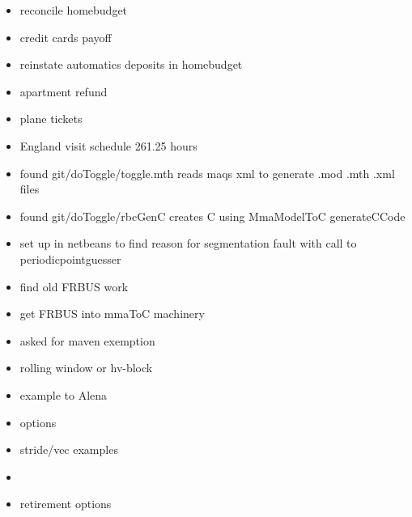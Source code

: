 \documentclass[hyperref]{labbook}
\begin{document}

\begin{itemize}
\item reconcile homebudget
\item credit cards payoff
\item reinstate automatics deposits in homebudget
\item apartment refund
\end{itemize}



\begin{itemize}
\item plane tickets
\item England visit schedule  261.25 hours
\end{itemize}



\begin{itemize}
\item found git/doToggle/toggle.mth  reads maqs xml to generate .mod .mth .xml files
\item found git/doToggle/rbcGenC   creates C using MmaModelToC generateCCode 
\item set up in netbeans to find reason for segmentation fault with call to periodicpointguesser
\item find old FRBUS work
\item get FRBUS into mmaToC machinery
\item asked for maven exemption
\end{itemize}


\begin{itemize}
\item rolling window or hv-block
\item example to Alena
\end{itemize}


\begin{itemize}
\item options
\item stride/vec examples
\item 
\end{itemize}
\begin{itemize}
\item retirement options
\end{itemize}
\end{document}
